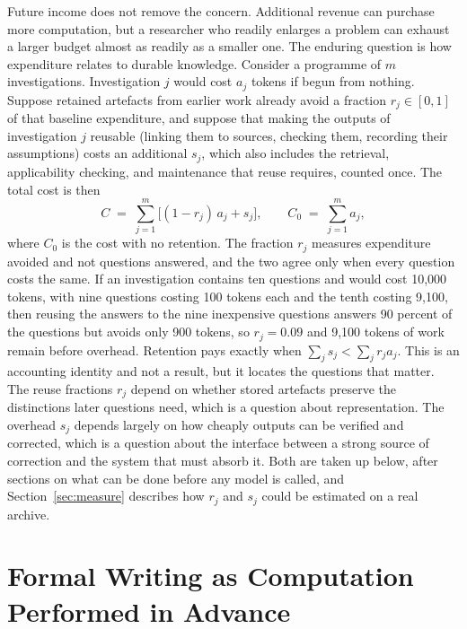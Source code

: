 \documentclass[11pt]{article}
\theoremstyle{remark}
\begin{document}
Future income does not remove the concern. Additional revenue can purchase more computation, but a researcher who readily enlarges a problem can exhaust a larger budget almost as readily as a smaller one. The enduring question is how expenditure relates to durable knowledge. Consider a programme of $m$ investigations. Investigation $j$ would cost $a_j$ tokens if begun from nothing. Suppose retained artefacts from earlier work already avoid a fraction $r_j \in [0,1]$ of that baseline expenditure, and suppose that making the outputs of investigation $j$ reusable (linking them to sources, checking them, recording their assumptions) costs an additional $s_j$, which also includes the retrieval, applicability checking, and maintenance that reuse requires, counted once. The total cost is then
\begin{equation}
C \;=\; \sum_{j=1}^{m}\bigl[(1-r_j)\,a_j + s_j\bigr],
\qquad
C_0 \;=\; \sum_{j=1}^{m} a_j ,
\end{equation}
where $C_0$ is the cost with no retention. The fraction $r_j$ measures expenditure avoided and not questions answered, and the two agree only when every question costs the same. If an investigation contains ten questions and would cost 10{,}000 tokens, with nine questions costing 100 tokens each and the tenth costing 9{,}100, then reusing the answers to the nine inexpensive questions answers 90 percent of the questions but avoids only 900 tokens, so $r_j = 0.09$ and 9{,}100 tokens of work remain before overhead. Retention pays exactly when $\sum_j s_j < \sum_j r_j a_j$. This is an accounting identity and not a result, but it locates the questions that matter. The reuse fractions $r_j$ depend on whether stored artefacts preserve the distinctions later questions need, which is a question about representation. The overhead $s_j$ depends largely on how cheaply outputs can be verified and corrected, which is a question about the interface between a strong source of correction and the system that must absorb it. Both are taken up below, after sections on what can be done before any model is called, and Section~\ref{sec:measure} describes how $r_j$ and $s_j$ could be estimated on a real archive.

\section{Formal Writing as Computation Performed in Advance}
\end{document}
